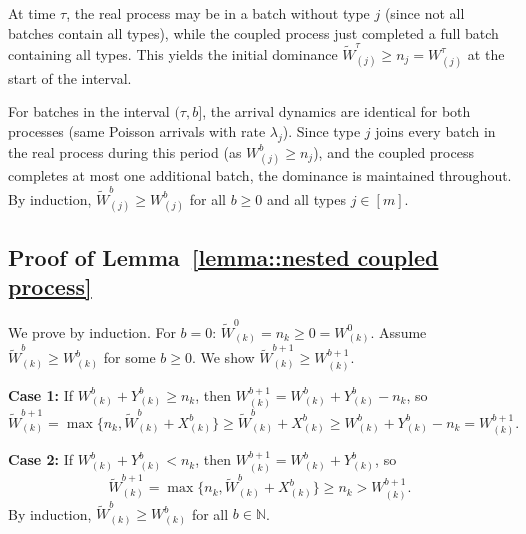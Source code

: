 At time $\tau$, the real process may be in a batch without type $j$ (since not all batches contain all types), while the coupled process just completed a full batch containing all types. This yields the initial dominance $\tilde{W}_{(j)}^\tau\geq n_j = W_{(j)}^\tau$ at the start of the interval.

For batches in the interval $(\tau, b]$, the arrival dynamics are identical for both processes (same Poisson arrivals with rate $\lambda_j$). Since type $j$ joins every batch in the real process during this period (as $W^b_{(j)}\geq n_j$), and the coupled process completes at most one additional batch, the dominance is maintained throughout. By induction, $\tilde{W}^b_{(j)}\geq W^b_{(j)}$ for all $b\geq 0$ and all types $j\in[m]$. 

\subsection{Proof of Lemma~\ref{lemma::nested coupled process}}\label{appendix_lemma::proof of nested coupled process}
We prove by induction. For $b = 0$: $\tilde{W}_{(k)}^0 = n_{k}\geq 0=W_{(k)}^0$. Assume $\tilde{W}^b_{(k)}\geq W^b_{(k)}$ for some $b\geq 0$. We show $\tilde{W}^{b+1}_{(k)}\geq W^{b+1}_{(k)}$.

\textbf{Case 1:} If $W^b_{(k)}+ Y^b_{(k)}\geq n_k$, then $W^{b+1}_{(k)}= W^{b}_{(k)}+Y^b_{(k)} - n_k$, so
$$ \tilde{W}^{b+1}_{(k)}=  \max\{ n_{k},\tilde{W}^{b}_{(k)} + X^b_{(k)}\} \geq \tilde{W}^{b}_{(k)} + X^b_{(k)}\geq {W}^{b}_{(k)} + Y^b_{(k)}-n_k=W^{b+1}_{(k)}.$$

\textbf{Case 2:} If $W^b_{(k)}+ Y^b_{(k)}<n_k$, then $W^{b+1}_{(k)}= W^{b}_{(k)}+Y^b_{(k)}$, so
$$\tilde{W}^{b+1}_{(k)}=  \max\{ n_{k},\tilde{W}^{b}_{(k)} + X^b_{(k)}\} \geq n_{k}> W^{b+1}_{(k)}.$$
By induction, $\tilde{W}^b_{(k)}\geq W^b_{(k)}$ for all $b\in \mathbb{N}$.

